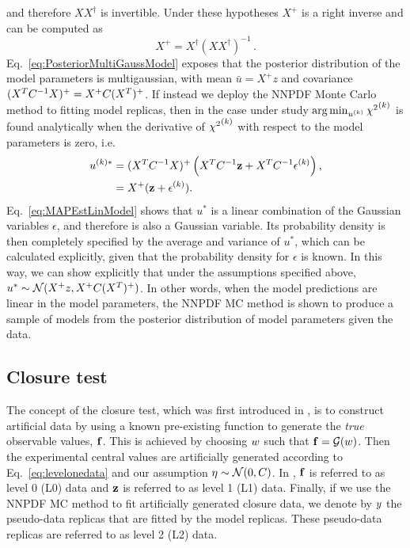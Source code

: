 and therefore $X X^\dagger$ is invertible. Under these hypotheses $X^+$ is a
right inverse and can be computed as
\begin{equation}
    \label{eq:RightInverse}
    X^+ = X^\dagger \left(X X^\dagger\right)^{-1}\, .
\end{equation}
Eq.~\ref{eq:PosteriorMultiGaussModel} exposes that the posterior distribution of
the model parameters is multigaussian, with mean $\bar{u} = X^+z$ and covariance
$(X^TC^{-1}_{}X)^+ = X^+ C (X^T)^+$. If instead we deploy the NNPDF Monte
Carlo method to fitting model replicas, then in the case under study
$\arg\min_{u^{(k)}} {\chi^2}^{(k)}$ is found analytically when the derivative of
${\chi^2}^{(k)}$ with respect to the model parameters is zero, i.e.
\begin{equation}
    \label{eq:MAPEstLinModel}
    \begin{split}
        u^{(k) *} &= (X^TC^{-1}_{}X)^{+}
        \left( X^T C^{-1}_{} \mathbf{z} + X^T C^{-1}_{} \mathbf{\epsilon}^{(k)} \right), \\
        &= X^+ (\mathbf{z} + \mathbf{\epsilon}^{(k)}).
    \end{split}
\end{equation}
Eq.~\ref{eq:MAPEstLinModel} shows that $u^*$ is a linear combination of the
Gaussian variables $\epsilon$, and therefore is also a Gaussian variable. Its
probability density is then completely specified by the average and variance of
$u^*$, which can be calculated explicitly, given that the probability density
for $\epsilon$ is known.  In this way, we can show explicitly that under the
assumptions specified above, $u^{*} \sim \mathcal{N}( X^+z, X^+ C (X^T)^+)$.
In other words, when the model predictions are linear in the model parameters,
the NNPDF MC method is shown to produce a sample of models from the posterior
distribution of model parameters given the data.

\subsection{Closure test}

The concept of the closure test, which was first introduced in \cite{nnpdf30},
is to construct artificial data by using a known pre-existing function to
generate the {\em true} observable values, $\mathbf{f}$. This is achieved by
choosing $w$ such that $\mathbf{f} = \mathcal{G}(w)$. Then the
experimental central values are artificially generated according to
Eq.~\ref{eq:levelonedata} and our assumption $\mathbf{\eta} \sim \mathcal{N}(0,
C)$. In \cite{nnpdf30}, $\mathbf{f}$ is referred to as level 0 (L0) data and
$\mathbf{z}$ is referred to as level 1 (L1) data. Finally, if we use the NNPDF
MC method to fit artificially generated closure data, we denote by $y$ the
pseudo-data replicas that are fitted by the model replicas. These pseudo-data
replicas are referred to as level 2 (L2) data.

